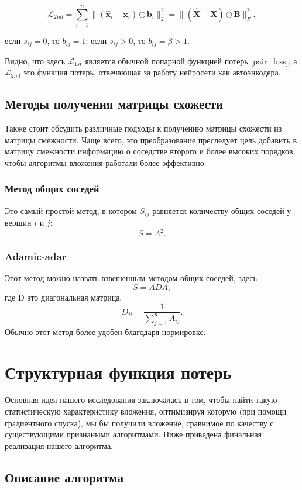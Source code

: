 \documentclass[12pt,a4paper]{extarticle}
\newcommand{\Loss}{\mathcal{L}}
\begin{document}
    $$
    \Loss_{2nd} = \sum_{i=1}^{n} \lVert (\mathbf{\hat{x}}_i - \mathbf{x}_i) \odot \mathbf{b}_i \rVert_2^2 = \lVert (\mathbf{\hat{X}} - \mathbf{X}) \odot \mathbf{B} \rVert^2_F,
    $$
    
    если $s_{ij} = 0$, то $b_{ij} = 1$; если $s_{ij} > 0$, то $b_{ij} = \beta > 1$.
    
    Видно, что здесь $\Loss_{1st}$ является обычной попарной функцией потерь \eqref{pair_loss}, а $\Loss_{2nd}$ это функция потерь, отвечающая за работу нейросети как автоэнкодера.

    
    \subsection{Методы получения матрицы схожести}
    Также стоит обсудить различные подходы к получению матрицы схожести из матрицы смежности.
    Чаще всего, это преобразование преследует цель добавить в матрицу смежности информацию о соседстве второго и более высоких порядков, чтобы алгоритмы вложения работали более эффективно.
    \subsubsection{Метод общих соседей}
    Это самый простой метод, в котором $S_{ij}$ равняется количеству общих соседей у вершин $i$ и $j$:
    \[S = A^2.\]
    \subsubsection{Adamic-adar}
    Этот метод можно назвать взвешенным методом общих соседей, здесь
    \[S = A D A,\]
    где D это диагональная матрица,
    \[D_{ii} = \frac{1}{\sum_{j=1}^n A_{ij}}.\]
    Обычно этот метод более удобен благодаря нормировке.
    
    \section{Структурная функция потерь}
    
    Основная идея нашего исследования заключалась в том, чтобы найти такую статистическую характеристику вложения, оптимизируя которую (при помощи градиентного спуска), мы бы получили вложение, сравнимое по качеству с существующими признаными алгоритмами.
    Ниже приведена финальная реализация нашего алгоритма.
    
    \subsection{Описание алгоритма}
    
\end{document}

